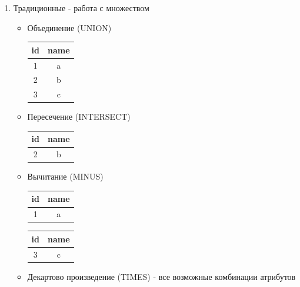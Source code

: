 \documentclass[a4paper, 14pt]{report}
\begin{document}
\begin{enumerate}
    \item Традиционные - работа с множеством

        \begin{itemize}
            \item Объединение (UNION)

                \begin{tabular}{|c|c|}
                    \hline
                    id & name \\
                    \hline
                    1 & a \\
                    \hline
                    2 & b \\
                    \hline
                    3 & c \\
                    \hline
                \end{tabular}

            \item Пересечение (INTERSECT)

                \begin{tabular}{|c|c|}
                    \hline
                    id & name \\
                    \hline
                    2 & b \\
                    \hline
                \end{tabular}

            \item Вычитание (MINUS)

                \begin{tabular}{|c|c|}
                    \hline
                    id & name \\
                    \hline
                    1 & a \\
                    \hline 
                \end{tabular}

                \begin{tabular}{|c|c|}
                    \hline
                    id & name \\
                    \hline
                    3 & c \\
                    \hline 
                \end{tabular}

            \item Декартово произведение (TIMES) - все возможные комбинации атрибутов
        \end{itemize}


\end{enumerate}
\end{document}
